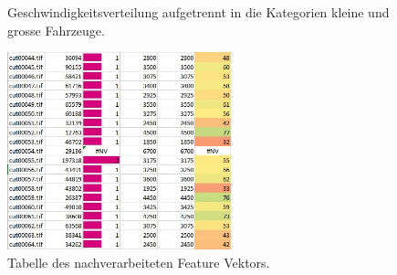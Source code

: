 \begin{figure}[H]
  \centering
  \caption{Geschwindigkeitsverteilung aufgetrennt in die Kategorien kleine und grosse Fahrzeuge.}
  \label{bFrames}
\end{figure}

\begin{figure}[H]
  \centering
  \includegraphics[width=0.58\textwidth]{Resultate/Nachverarbeitung.jpg} 
  \caption{Tabelle des nachverarbeiteten Feature Vektors.}
  \label{bNachverarbeitung}
\end{figure}
